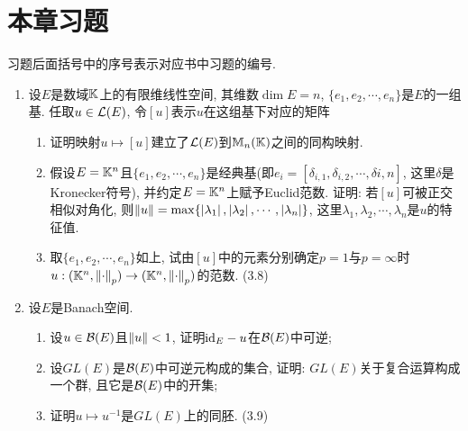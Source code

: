 \section*{本章习题}
	
	习题后面括号中的序号表示对应书中习题的编号.
	
	\begin{enumerate}[label=\textbf{\arabic*.}, ref=\arabic*]
	\item 设$ E $是数域$ \mathbb{K} $上的有限维线性空间, 其维数$ \dim E=n $, $ \{ e_1,e_2,\cdots,e_n \} $是$ E $的一组基. 任取$ u\in\mathcal{L}(E) $, 令$ [u] $表示$ u $在这组基下对应的矩阵
		\begin{enumerate}[(1)]
		\item 证明映射$ u\mapsto[u] $建立了$ \mathcal{L}(E) $到$ \mathbb{M}_n(\mathbb{K}) $之间的同构映射.
		\item 假设$ E=\mathbb{K}^n $且$ \{ e_1,e_2,\cdots,e_n \} $是经典基(即$ e_i=[\delta_{i,1},\delta_{i,2},\cdots,\delta{i,n}] $, 这里$ \delta $是Kronecker符号), 并约定$ E=\mathbb{K}^n $上赋予Euclid范数. 证明: 若$ [u] $可被正交相似对角化, 则$ \left\| u \right\|=\max\{ \left| \lambda_1 \right| ,\left| \lambda_2 \right| ,\cdots,\left| \lambda_n \right|  \} $, 这里$ \lambda_1,\lambda_2,\cdots,\lambda_n $是$ u $的特征值.
		\item 取$ \{ e_1,e_2,\cdots,e_n \} $如上, 试由$ [u] $中的元素分别确定$ p=1 $与$ p=\infty $时$ u : (\mathbb{K}^n,\left\| \cdot \right\|_p)\to(\mathbb{K}^n,\left\| \cdot \right\|_p) $的范数. (3.8)
		\end{enumerate}
	\item 设$ E $是Banach空间.
		\begin{enumerate}[(1)]
		\item 设$ u\in\mathcal{B}(E) $且$ \left\| u \right\|<1 $, 证明$ \mathrm{id}_E-u $在$ \mathcal{B}(E) $中可逆;
		\item 设$ GL(E) $是$ \mathcal{B}(E) $中可逆元构成的集合, 证明: $ GL(E) $关于复合运算构成一个群, 且它是$ \mathcal{B}(E) $中的开集;
		\item 证明$ u\mapsto u^{-1} $是$ GL(E) $上的同胚. (3.9)
		\end{enumerate}
	\end{enumerate}
	

